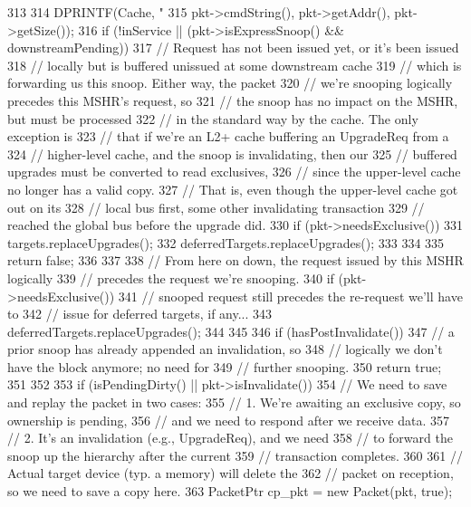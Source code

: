 \begin{DoxyCode}
313 {
314     DPRINTF(Cache, "%
315             pkt->cmdString(), pkt->getAddr(), pkt->getSize());
316     if (!inService || (pkt->isExpressSnoop() && downstreamPending)) {
317         // Request has not been issued yet, or it's been issued
318         // locally but is buffered unissued at some downstream cache
319         // which is forwarding us this snoop.  Either way, the packet
320         // we're snooping logically precedes this MSHR's request, so
321         // the snoop has no impact on the MSHR, but must be processed
322         // in the standard way by the cache.  The only exception is
323         // that if we're an L2+ cache buffering an UpgradeReq from a
324         // higher-level cache, and the snoop is invalidating, then our
325         // buffered upgrades must be converted to read exclusives,
326         // since the upper-level cache no longer has a valid copy.
327         // That is, even though the upper-level cache got out on its
328         // local bus first, some other invalidating transaction
329         // reached the global bus before the upgrade did.
330         if (pkt->needsExclusive()) {
331             targets.replaceUpgrades();
332             deferredTargets.replaceUpgrades();
333         }
334 
335         return false;
336     }
337 
338     // From here on down, the request issued by this MSHR logically
339     // precedes the request we're snooping.
340     if (pkt->needsExclusive()) {
341         // snooped request still precedes the re-request we'll have to
342         // issue for deferred targets, if any...
343         deferredTargets.replaceUpgrades();
344     }
345 
346     if (hasPostInvalidate()) {
347         // a prior snoop has already appended an invalidation, so
348         // logically we don't have the block anymore; no need for
349         // further snooping.
350         return true;
351     }
352 
353     if (isPendingDirty() || pkt->isInvalidate()) {
354         // We need to save and replay the packet in two cases:
355         // 1. We're awaiting an exclusive copy, so ownership is pending,
356         //    and we need to respond after we receive data.
357         // 2. It's an invalidation (e.g., UpgradeReq), and we need
358         //    to forward the snoop up the hierarchy after the current
359         //    transaction completes.
360         
361         // Actual target device (typ. a memory) will delete the
362         // packet on reception, so we need to save a copy here.
363         PacketPtr cp_pkt = new Packet(pkt, true);
}}
\end{DoxyCode}
